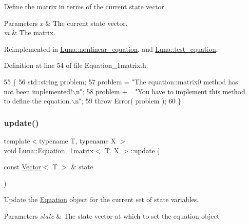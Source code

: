 Define the matrix in terms of the current state vector. 


\begin{DoxyParams}{Parameters}
{\em x} & The current state vector. \\
\hline
{\em m} & The matrix. \\
\hline
\end{DoxyParams}


Reimplemented in \hyperlink{classLuna_1_1nonlinear__equation_a467d48cbfdb69fddc877e00dc24a397a}{Luna\+::nonlinear\+\_\+equation}, and \hyperlink{classLuna_1_1test__equation_a955940cd7cc59fbaef213151075f1838}{Luna\+::test\+\_\+equation}.



Definition at line 54 of file Equation\+\_\+1matrix.\+h.


\begin{DoxyCode}
55    \{
56      std::string problem;
57      problem = \textcolor{stringliteral}{"The equation::matrix0 method has not been implemented!\(\backslash\)n"};
58      problem += \textcolor{stringliteral}{"You have to implement this method to define the equation.\(\backslash\)n"};
59      \textcolor{keywordflow}{throw} Error( problem );
60    \}
\end{DoxyCode}
\mbox{\label{classLuna_1_1Equation__1matrix_a08f510d89ae39ed46752cddea5376ae8}} 
\subsubsection{\texorpdfstring{update()}{update()}}
{\footnotesize\ttfamily template$<$typename T, typename X $>$ \\
void \hyperlink{classLuna_1_1Equation__1matrix}{Luna\+::\+Equation\+\_\+1matrix}$<$ T, X $>$\+::update (\begin{DoxyParamCaption}\item[{const \hyperlink{classLuna_1_1Vector}{Vector}$<$ T $>$ \&}]{state }\end{DoxyParamCaption})}



Update the \hyperlink{classLuna_1_1Equation}{Equation} object for the current set of state variables. 


\begin{DoxyParams}{Parameters}
{\em state} & The state vector at which to set the equation object \\
\hline
\end{DoxyParams}


